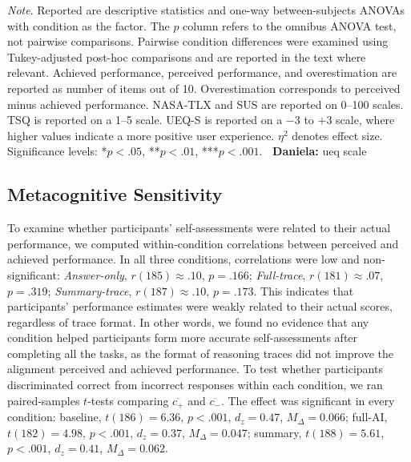 \documentclass[acmlarge,review=true, anonymous=true]{acmart}
\newcommand{\daniela}[1]{\textcolor{colordaniela}{\textbf{\faComment~Daniela:} #1}}
\begin{document}
\begin{table}[H]


\raggedright \small \textit{Note}. Reported are descriptive statistics and one-way between-subjects ANOVAs with condition as the factor. The $p$ column refers to the omnibus ANOVA test, not pairwise comparisons. Pairwise condition differences were examined using Tukey-adjusted post-hoc comparisons and are reported in the text where relevant. Achieved performance, perceived performance, and overestimation are reported as number of items out of 10. Overestimation corresponds to perceived minus achieved performance. NASA-TLX and SUS are reported on 0--100 scales. TSQ is reported on a 1--5 scale. UEQ-S is reported on a $-3$ to $+3$ scale, where higher values indicate a more positive user experience. $\eta^2$ denotes effect size. Significance levels: *$p < .05$, **$p < .01$, ***$p < .001$. \daniela{ueq scale }
\end{table}


\subsection{Metacognitive Sensitivity}


To examine whether participants' self-assessments were related to their actual performance, we computed within-condition correlations between perceived and achieved performance. In all three conditions, correlations were low and non-significant: \textit{Answer-only}, $r(185) \approx .10$, $p = .166$; \textit{Full-trace}, $r(181) \approx .07$, $p = .319$; \textit{Summary-trace}, $r(187) \approx .10$, $p = .173$. This indicates that participants' performance estimates were weakly related to their actual scores, regardless of trace format. In other words, we found no evidence that any condition helped participants form more accurate self-assessments after completing all the tasks, as the format of reasoning traces did not improve the alignment perceived and achieved performance. To test whether participants discriminated correct from incorrect responses within each condition, we ran paired-samples $t$-tests comparing $\overline{c_{+}}$ and
$\overline{c_{-}}$. The effect was significant in every condition: baseline, $t(186) = 6.36$, $p < .001$, $d_z = 0.47$, $M_{\Delta} = 0.066$; full-AI, $t(182) = 4.98$, $p < .001$, $d_z = 0.37$, $M_{\Delta} = 0.047$; summary, $t(188) = 5.61$,
$p < .001$, $d_z = 0.41$, $M_{\Delta} = 0.062$.
\end{document}
